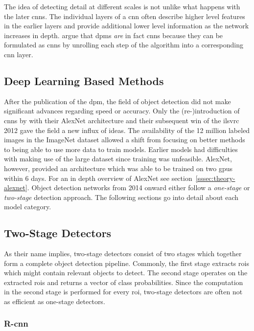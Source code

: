 \documentclass[draft,final]{vutinfth} %
\begin{document}
The idea of detecting detail at different scales is not unlike what
happens with the later \glspl{cnn}. The individual layers of a
\gls{cnn} often describe higher level features in the earlier layers
and provide additional lower level information as the network
increases in depth. \textcite{girshick2015} argue that \glspl{dpm}
\emph{are} in fact \glspl{cnn} because they can be formulated as
\glspl{cnn} by unrolling each step of the algorithm into a
corresponding \gls{cnn} layer.

\subsection{Deep Learning Based Methods}
\label{ssec:theory-dl-based}

After the publication of the \gls{dpm}, the field of object detection
did not make significant advances regarding speed or accuracy. Only
the (re-)introduction of \glspl{cnn} by \textcite{krizhevsky2012} with
their AlexNet architecture and their subsequent win of the
\gls{ilsvrc} 2012 gave the field a new influx of ideas. The
availability of the 12 million labeled images in the ImageNet dataset
\cite{deng2009} allowed a shift from focusing on better methods to
being able to use more data to train models. Earlier models had
difficulties with making use of the large dataset since training was
unfeasible. AlexNet, however, provided an architecture which was able
to be trained on two \glspl{gpu} within 6 days. For an in depth
overview of AlexNet see section~\ref{sssec:theory-alexnet}. Object
detection networks from 2014 onward either follow a \emph{one-stage}
or \emph{two-stage} detection approach. The following sections go into
detail about each model category.

\subsection{Two-Stage Detectors}
\label{ssec:theory-two-stage}

As their name implies, two-stage detectors consist of two stages which
together form a complete object detection pipeline. Commonly, the
first stage extracts \glspl{roi} which might contain relevant objects
to detect. The second stage operates on the extracted \glspl{roi} and
returns a vector of class probabilities. Since the computation in the
second stage is performed for every \gls{roi}, two-stage detectors are
often not as efficient as one-stage detectors.

\subsubsection{R-\gls{cnn}}
\label{sssec:theory-rcnn}
\end{document}

